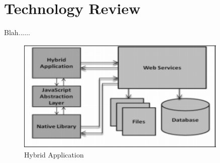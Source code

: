 \chapter{Technology Review}
Blah......




\begin{figure}[h!]
	\caption{Hybrid Application}
	\label{image:myImageName}
	\centering
	\includegraphics[width=0.9\textwidth]{Images/hybrid_dev_img.PNG}
\end{figure}